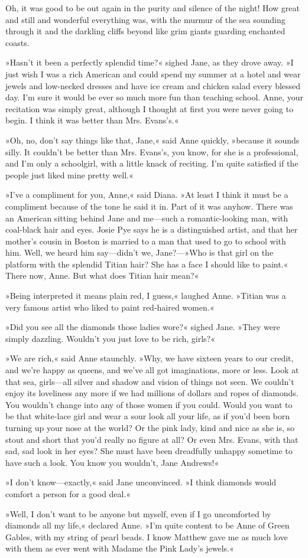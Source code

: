 Oh, it was good to be out again in the purity and silence of the night! How great and still and wonderful everything was, with the murmur of the sea sounding through it and the darkling cliffs beyond like grim giants guarding enchanted coasts.

»Hasn’t it been a perfectly splendid time?« sighed Jane, as they drove away. »I just wish I was a rich American and could spend my summer at a hotel and wear jewels and low-necked dresses and have ice cream and chicken salad every blessed day. I’m sure it would be ever so much more fun than teaching school. Anne, your recitation was simply great, although I thought at first you were never going to begin. I think it was better than Mrs. Evans’s.«

»Oh, no, don’t say things like that, Jane,« said Anne quickly, »because it sounds silly. It couldn’t be better than Mrs. Evans’s, you know, for she is a professional, and I’m only a schoolgirl, with a little knack of reciting. I’m quite satisfied if the people just liked mine pretty well.«

»I’ve a compliment for you, Anne,« said Diana. »At least I think it must be a compliment because of the tone he said it in. Part of it was anyhow. There was an American sitting behind Jane and me—such a romantic-looking man, with coal-black hair and eyes. Josie Pye says he is a distinguished artist, and that her mother’s cousin in Boston is married to a man that used to go to school with him. Well, we heard him say—didn’t we, Jane?—»Who is that girl on the platform with the splendid Titian hair? She has a face I should like to paint.« There now, Anne. But what does Titian hair mean?«

»Being interpreted it means plain red, I guess,« laughed Anne. »Titian was a very famous artist who liked to paint red-haired women.«

»Did you see all the diamonds those ladies wore?« sighed Jane. »They were simply dazzling. Wouldn’t you just love to be rich, girls?«

»We are rich,« said Anne staunchly. »Why, we have sixteen years to our credit, and we’re happy as queens, and we’ve all got imaginations, more or less. Look at that sea, girls—all silver and shadow and vision of things not seen. We couldn’t enjoy its loveliness any more if we had millions of dollars and ropes of diamonds. You wouldn’t change into any of those women if you could. Would you want to be that white-lace girl and wear a sour look all your life, as if you’d been born turning up your nose at the world? Or the pink lady, kind and nice as she is, so stout and short that you’d really no figure at all? Or even Mrs. Evans, with that sad, sad look in her eyes? She must have been dreadfully unhappy sometime to have such a look. You know you wouldn’t, Jane Andrews!«

»I don’t know—exactly,« said Jane unconvinced. »I think diamonds would comfort a person for a good deal.«

»Well, I don’t want to be anyone but myself, even if I go uncomforted by diamonds all my life,« declared Anne. »I’m quite content to be Anne of Green Gables, with my string of pearl beads. I know Matthew gave me as much love with them as ever went with Madame the Pink Lady’s jewels.«